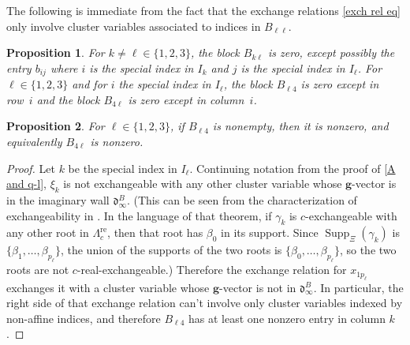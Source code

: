 \documentclass{amsart}
\newtheorem{proposition}{Proposition}[section]
\theoremstyle{definition}
\theoremstyle{remark}
\numberwithin{equation}{section}
\newcommand{\set}[1]{{\lbrace #1 \rbrace}}
\newcommand{\0}{{\mathbf{0}}}
\newcommand{\g}{\mathbf{g}}
\newcommand{\re}{\mathrm{re}}
\renewcommand{\d}{{\mathfrak d}}
\newcommand{\SimplesTChar}{\Xi}
\newcommand{\SuppT}{\operatorname{Supp}_\SimplesTChar}
\newcommand{\APTChar}{\Lambda}
\newcommand{\APT}[1]{\APTChar_{#1}}
\newcommand{\APTre}[1]{\APT{#1}^\re}
\begin{document}
The following  is immediate from the fact that the exchange relations \eqref{exch rel eq} only involve cluster variables associated to indices in $B_{\ell\ell}$.

\begin{proposition}\label{mostly zeros}
For  $k\neq\ell\in\set{1,2,3}$, the block $B_{k\ell}$ is zero, except possibly the entry $b_{ij}$ where $i$ is the special index in $I_k$ and $j$ is the special index in $I_\ell$.
For $\ell\in\set{1,2,3}$ and for $i$ the special index in $I_\ell$, the block $B_{\ell4}$ is zero except in row~$i$ and the block $B_{4\ell}$ is zero except in column~$i$.
\end{proposition}

\begin{proposition}\label{not all zeros}
For $\ell\in\set{1,2,3}$, if $B_{\ell4}$ is nonempty, then it is nonzero, and equivalently $B_{4\ell}$ is nonzero.
\end{proposition}
\begin{proof}
Let $k$ be the special index in $I_\ell$.
Continuing notation from the proof of \cref{A and q-l}, $\xi_k$ is not exchangeable with any other cluster variable whose $\g$-vector is in the imaginary wall $\d^B_\infty$.
(This can be seen from the characterization of exchangeability in \cite[Theorem~7.2]{affdenom}.
In the language of that theorem, if $\gamma_k$ is $c$-exchangeable with any other root in $\APTre{c}$, then that root has $\beta_0$ in its support.
Since $\SuppT(\gamma_k)$ is $\set{\beta_1,\ldots,\beta_{p_\ell}}$, the union of the supports of the two roots is $\set{\beta_0,\ldots,\beta_{p_\ell}}$, so the two roots are not $c$-real-exchangeable.)
Therefore the exchange relation for $x_{1p_\ell}$ exchanges it with a cluster variable whose $\g$-vector is not in $\d^B_\infty$.  
In particular, the right side of that exchange relation can't involve only cluster variables indexed by non-affine indices, and therefore $B_{\ell4}$ has at least one nonzero entry in column $k$.
\end{proof}
\end{document}
